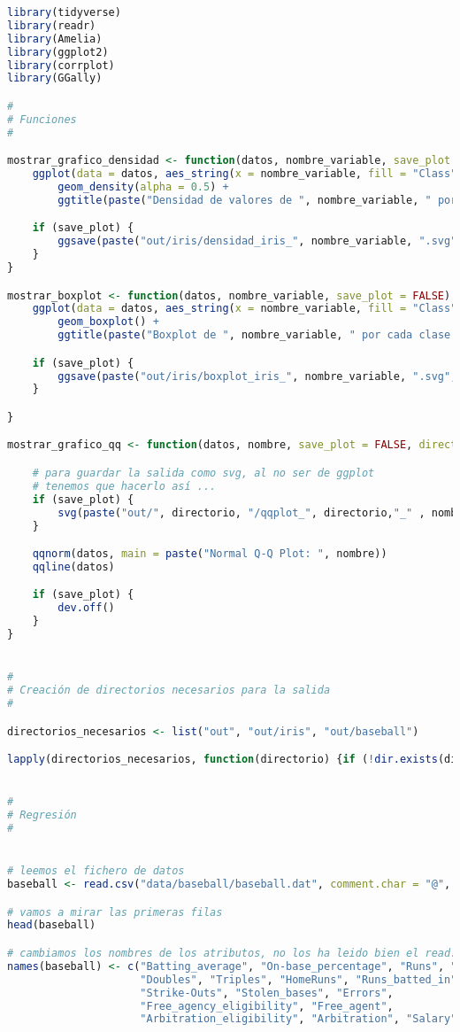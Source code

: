 \begin{lstlisting}[language=R]
library(tidyverse)
library(readr)
library(Amelia)
library(ggplot2)
library(corrplot)
library(GGally)

#
# Funciones
#

mostrar_grafico_densidad <- function(datos, nombre_variable, save_plot = FALSE) {
	ggplot(data = datos, aes_string(x = nombre_variable, fill = "Class")) +
		geom_density(alpha = 0.5) +
		ggtitle(paste("Densidad de valores de ", nombre_variable, " por cada clase."))

	if (save_plot) {
		ggsave(paste("out/iris/densidad_iris_", nombre_variable, ".svg", sep = ""), device = svg, width = 1920, height = 1080, units = "px", dpi = 150)
	}
}

mostrar_boxplot <- function(datos, nombre_variable, save_plot = FALSE) {
	ggplot(data = datos, aes_string(x = nombre_variable, fill = "Class")) +
		geom_boxplot() +
		ggtitle(paste("Boxplot de ", nombre_variable, " por cada clase."))

	if (save_plot) {
		ggsave(paste("out/iris/boxplot_iris_", nombre_variable, ".svg", sep = ""), device = svg, width = 1920, height = 1080, units = "px", dpi = 150)
	}

}

mostrar_grafico_qq <- function(datos, nombre, save_plot = FALSE, directorio = "iris") {

	# para guardar la salida como svg, al no ser de ggplot
	# tenemos que hacerlo así ...
	if (save_plot) {
		svg(paste("out/", directorio, "/qqplot_", directorio,"_" , nombre, ".svg", sep = ""))
	}

	qqnorm(datos, main = paste("Normal Q-Q Plot: ", nombre))
	qqline(datos)

	if (save_plot) {
		dev.off()
	}
}


#
# Creación de directorios necesarios para la salida
#

directorios_necesarios <- list("out", "out/iris", "out/baseball")

lapply(directorios_necesarios, function(directorio) {if (!dir.exists(directorio)) dir.create(directorio) })


#
# Regresión
#


# leemos el fichero de datos
baseball <- read.csv("data/baseball/baseball.dat", comment.char = "@", header = FALSE)

# vamos a mirar las primeras filas
head(baseball)

# cambiamos los nombres de los atributos, no los ha leido bien el read.csv
names(baseball) <- c("Batting_average", "On-base_percentage", "Runs", "Hits",
					 "Doubles", "Triples", "HomeRuns", "Runs_batted_in", "Walks",
					 "Strike-Outs", "Stolen_bases", "Errors",
					 "Free_agency_eligibility", "Free_agent",
					 "Arbitration_eligibility", "Arbitration", "Salary")


\end{lstlisting}
